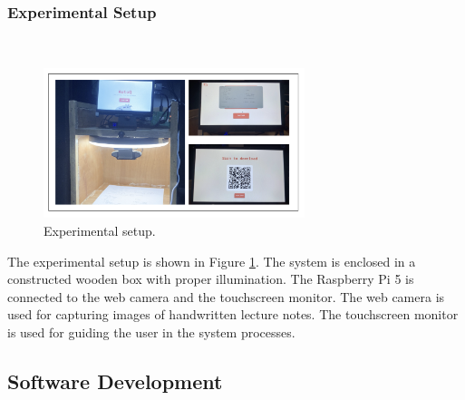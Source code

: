 \documentclass[conference]{IEEEtran}
\begin{document}
        \subsubsection{Experimental Setup}
            \hfill \\
            \vspace{-0.6cm}
            \begin{figure}[H]
                \centerline{\includegraphics[width=3in]{experimental.png}}
                \vspace{-0.3cm}
                \caption{Experimental setup.} 
                \label{experimental}
            \end{figure} 
            \vspace{-0.3cm}
            \indent The experimental setup is shown in 
            Figure \ref{experimental}. The system is enclosed in a
            constructed wooden box with proper illumination. The
            Raspberry Pi 5 is connected to the web camera and the
            touchscreen monitor. The web camera is used for capturing
            images of handwritten lecture notes. The touchscreen
            monitor is used for guiding the user in the system
            processes.
    \subsection{Software Development}
\end{document}
